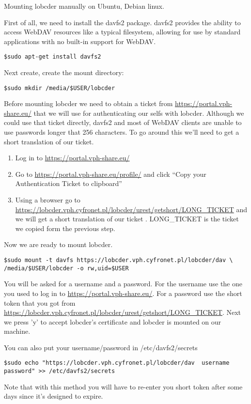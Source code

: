 \documentclass[a4paper,10pt]{report}
\title{}
\author{S. Koulouzis}
\begin{document}
\maketitle
Mounting lobcder manually on Ubuntu, Debian linux. 


First of all, we need to install the davfs2 package. davfs2 provides the ability to access WebDAV resources like a typical filesystem, allowing for use by standard applications with no built-in support for WebDAV. 

\begin{lstlisting}
$sudo apt-get install davfs2
\end{lstlisting}


Next create, create the mount directory:

\begin{lstlisting}
$sudo mkdir /media/$USER/lobcder
\end{lstlisting}

Before mounting lobcder we need to obtain a ticket from \url{https://portal.vph-share.eu/} that we will use for authenticating our selfs with lobcder. Although we could use that ticket directly, davfs2 and most of WebDAV clients are unable to use passwords longer that 256 characters. To go around this we'll need to get a short translation of our ticket.

\begin{enumerate}
 \item Log in to \url{https://portal.vph-share.eu/}
 \item Go to \url{https://portal.vph-share.eu/profile/} and click ``Copy your Authentication Ticket to clipboard''
 \item Using a browser go to \url{https://lobcder.vph.cyfronet.pl/lobcder/urest/getshort/LONG\_TICKET} and we will get a short translation of our ticket . LONG\_TICKET is the ticket we copied form the previous step.
\end{enumerate}

Now we are ready to mount lobcder. 

\begin{lstlisting}
$sudo mount -t davfs https://lobcder.vph.cyfronet.pl/lobcder/dav \
/media/$USER/lobcder -o rw,uid=$USER
\end{lstlisting}

You will be asked for a username and a password. For the username use the one you used to log in to \url{https://portal.vph-share.eu/}. For a password use the short token that you got from \url{https://lobcder.vph.cyfronet.pl/lobcder/urest/getshort/LONG_TICKET}. 
Next we press 'y' to accept lobcder's certificate and lobcder is mounted on our machine. 

You can also put your username/password in /etc/davfs2/secrets

\begin{lstlisting}
$sudo echo "https://lobcder.vph.cyfronet.pl/lobcder/dav  username  password" >> /etc/davfs2/secrets
\end{lstlisting}


Note that with this method you will have to re-enter you short token after some days since it's designed to expire.  
\end{document}
